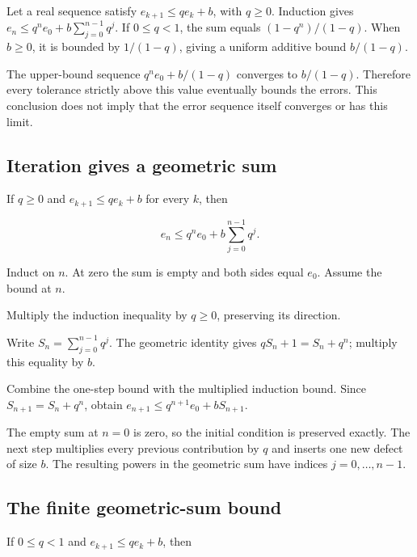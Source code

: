 \documentclass[11pt,a4paper]{report}
\begin{document}
Let a real sequence satisfy \(e_{k+1}\le qe_k+b\), with \(q\ge0\). Induction gives \(e_n\le q^ne_0+b\sum_{j=0}^{n-1}q^j\). If \(0\le q<1\), the sum equals \((1-q^n)/(1-q)\). When \(b\ge0\), it is bounded by \(1/(1-q)\), giving a uniform additive bound \(b/(1-q)\).



The upper-bound sequence \(q^ne_0+b/(1-q)\) converges to \(b/(1-q)\). Therefore every tolerance strictly above this value eventually bounds the errors. This conclusion does not imply that the error sequence itself converges or has this limit.

\subsection{\texorpdfstring{Iteration gives a geometric sum}{Iteration gives a geometric sum}}
\label{report-step-UnadjustedLangevin-Recurrence-lean-1}


If \(q\ge0\) and \(e_{k+1}\le qe_k+b\) for every \(k\), then

\[e_n\le q^ne_0+b\sum_{j=0}^{n-1}q^j.\]

Induct on \(n\). At zero the sum is empty and both sides equal \(e_0\). Assume the bound at \(n\).



Multiply the induction inequality by \(q\ge0\), preserving its direction.



Write \(S_n=\sum_{j=0}^{n-1}q^j\). The geometric identity gives \(qS_n+1=S_n+q^n\); multiply this equality by \(b\).



Combine the one-step bound with the multiplied induction bound. Since \(S_{n+1}=S_n+q^n\), obtain \(e_{n+1}\le q^{n+1}e_0+bS_{n+1}\).



The empty sum at \(n=0\) is zero, so the initial condition is preserved exactly. The next step multiplies every previous contribution by \(q\) and inserts one new defect of size \(b\). The resulting powers in the geometric sum have indices \(j=0,\ldots,n-1\).

\subsection{\texorpdfstring{The finite geometric-sum bound}{The finite geometric-sum bound}}
\label{report-step-UnadjustedLangevin-Recurrence-lean-2}


If \(0\le q<1\) and \(e_{k+1}\le qe_k+b\), then
\end{document}
